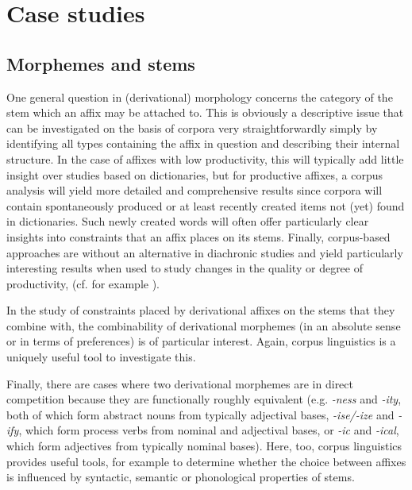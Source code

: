 \section{Case studies}
\label{sec:moprphologycasestudies}

\subsection{Morphemes and stems}
\label{sec:morphemesandstems}

One general question in (derivational) morphology  concerns the category of the stem  which an affix  may be attached to. This is obviously a descriptive  issue that can be investigated on the basis of corpora very straightforwardly simply by identifying all types  containing the affix  in question and describing their internal structure. In the case of affixes  with low productivity,  this will typically add little insight over studies based on dictionaries,  but for productive affixes,  a corpus analysis will yield more detailed and comprehensive results since corpora will contain spontaneously produced or at least recently created items not (yet) found in dictionaries.  Such newly created words will often offer particularly clear insights into constraints that an affix  places on its stems.  Finally, corpus\hyp{}based approaches are without an alternative in diachronic  studies and yield particularly interesting results when used to study changes in the quality or degree of productivity,  (cf. for example \citealt{dalton-puffer_french_1996}).

In the study of constraints placed by derivational affixes  on the stems  that they combine with, the combinability of derivational morphemes  (in an absolute sense or in terms of preferences) is of particular interest. Again, corpus linguistics is a uniquely useful tool to investigate this.

Finally, there are cases where two derivational morphemes  are in direct competition because they are functionally roughly equivalent (e.g. \textit{-ness} and \textit{-ity}, both of which form abstract nouns  from typically adjectival  bases, \textit{-ise/-ize} and \textit{-ify}, which form process  verbs  from nominal  and adjectival  bases, or \textit{-ic} and \textit{-ical}, which form adjectives  from typically nominal bases). Here, too, corpus linguistics provides useful tools, for example to determine whether the choice between affixes  is influenced by syntactic,  semantic or phonological properties of  stems.

